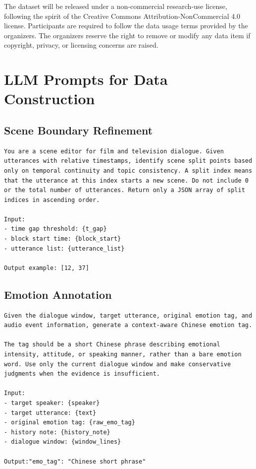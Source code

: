 \documentclass[a4paper]{article}
\begin{document}
The dataset will be released under a non-commercial research-use license, following the spirit of the Creative Commons Attribution-NonCommercial 4.0 license. Participants are required to follow the data usage terms provided by the organizers. The organizers reserve the right to remove or modify any data item if copyright, privacy, or licensing concerns are raised.


\section{LLM Prompts for Data Construction}
\label{app:prompts}

\subsection{Scene Boundary Refinement}

\begin{lstlisting}[style=jsonstyle]
You are a scene editor for film and television dialogue. Given utterances with relative timestamps, identify scene split points based only on temporal continuity and topic consistency. A split index means that the utterance at this index starts a new scene. Do not include 0 or the total number of utterances. Return only a JSON array of split indices in ascending order.

Input:
- time gap threshold: {t_gap}
- block start time: {block_start}
- utterance list: {utterance_list}

Output example: [12, 37]
\end{lstlisting}

\subsection{Emotion Annotation}

\begin{lstlisting}[style=jsonstyle]
Given the dialogue window, target utterance, original emotion tag, and audio event information, generate a context-aware Chinese emotion tag.

The tag should be a short Chinese phrase describing emotional intensity, attitude, or speaking manner, rather than a bare emotion word. Use only the current dialogue window and make conservative judgments when the evidence is insufficient.

Input:
- target speaker: {speaker}
- target utterance: {text}
- original emotion tag: {raw_emo_tag}
- history note: {history_note}
- dialogue window: {window_lines}

Output:"emo_tag": "Chinese short phrase"
\end{lstlisting}
\end{document}
